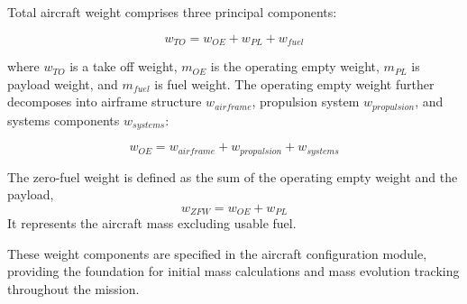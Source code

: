Total aircraft weight comprises three principal components:

\begin{equation}
w_{TO} = w_{OE} + w_{PL} + w_{fuel}
\end{equation}

where $w_{TO}$ is a take off weight, $m_{OE}$ is the operating empty weight, $m_{PL}$ is payload weight, and $m_{fuel}$ is fuel weight.
The operating empty weight further decomposes into airframe structure $w_{airframe}$, propulsion system $w_{propulsion}$, and systems components $w_{systems}$:

\begin{equation}
w_{OE} = w_{airframe} + w_{propulsion} + w_{systems}
\end{equation}



The zero-fuel weight is defined as the sum of the operating empty weight and the payload,
\begin{equation}
w_{ZFW} = w_{OE} + w_{PL}
\end{equation}
It represents the aircraft mass excluding usable fuel.

These weight components are specified in the aircraft configuration module, providing the foundation for initial mass calculations and mass evolution tracking throughout the mission.
